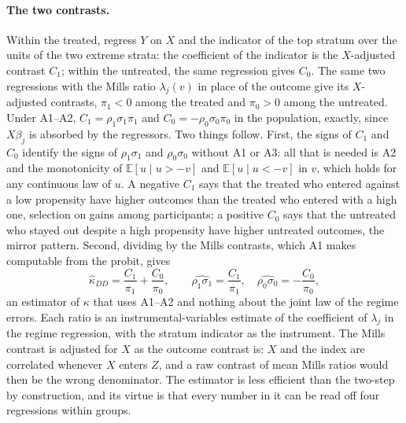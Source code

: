 \documentclass[11pt,a4paper]{article}
\theoremstyle{plain}
\theoremstyle{definition}
\theoremstyle{remark}
\newcommand{\E}{\mathbb{E}}
\newcommand{\1}{\mathbf{1}}
\begin{document}
\paragraph{The two contrasts.}
Within the treated, regress $Y$ on $X$ and the indicator of the top
stratum over the units of the two extreme strata: the coefficient of the
indicator is the $X$-adjusted contrast $C_1$; within the untreated, the
same regression gives $C_0$. The same two regressions with the Mills ratio
$\lambda_j(v)$ in place of the outcome give its $X$-adjusted contrasts,
$\pi_1<0$ among the treated and $\pi_0>0$ among the untreated. Under
A1--A2, $C_1=\rho_1\sigma_1\pi_1$ and $C_0=-\rho_0\sigma_0\pi_0$ in the
population, exactly, since $X\beta_j$ is absorbed by the regressors. Two
things follow. First, the signs of $C_1$ and $C_0$ identify the signs of
$\rho_1\sigma_1$ and $\rho_0\sigma_0$ without A1 or A3: all that is needed
is A2 and the monotonicity of $\E[u\mid u>-v]$ and $\E[u\mid u<-v]$ in
$v$, which holds for any continuous law of $u$. A
negative $C_1$ says that the treated who entered against a low
propensity have higher outcomes than the treated who entered with a high
one, selection on gains among participants; a positive $C_0$ says that
the untreated who stayed out despite a high propensity have higher
untreated outcomes, the mirror pattern. Second, dividing by the Mills
contrasts, which A1 makes computable from the probit, gives
\begin{equation}\label{eq:kdd}
\hat\kappa_{DD}=\frac{C_1}{\pi_1}+\frac{C_0}{\pi_0},\qquad
\widehat{\rho_1\sigma_1}=\frac{C_1}{\pi_1},\quad
\widehat{\rho_0\sigma_0}=-\frac{C_0}{\pi_0},
\end{equation}
an estimator of $\kappa$ that uses A1--A2 and nothing about the joint law
of the regime errors. Each ratio is an instrumental-variables estimate of
the coefficient of $\lambda_j$ in the regime regression, with the stratum
indicator as the instrument. The Mills contrast is adjusted for $X$ as the
outcome contrast is: $X$ and the index are correlated whenever $X$ enters
$Z$, and a raw contrast of mean Mills ratios would then be the wrong
denominator. The estimator is less efficient than the two-step by
construction, and its virtue is that every number in it can be read off
four regressions within groups.
\end{document}
